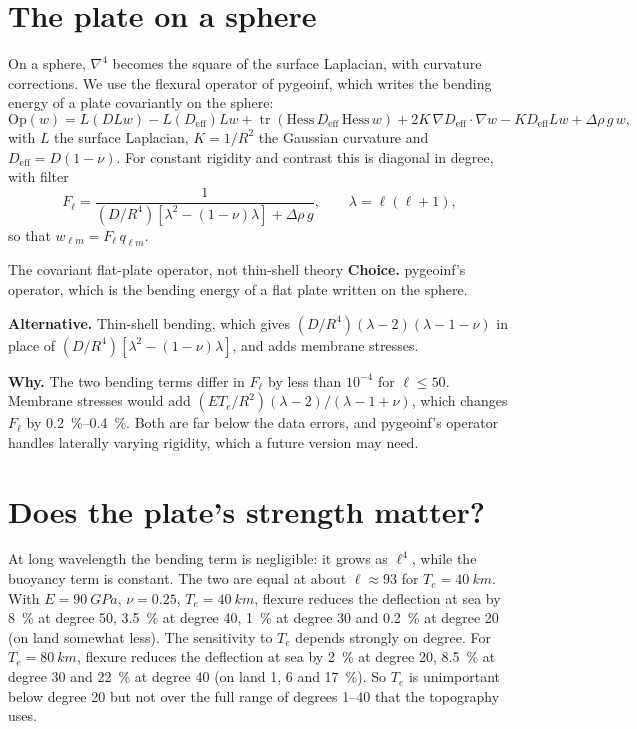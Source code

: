 \section{The plate on a sphere}

On a sphere, $\nabla^4$ becomes the square of the surface Laplacian, with curvature corrections.
We use the flexural operator of pygeoinf, which writes the bending energy of a plate covariantly on the sphere:
\[
    \mathrm{Op}(w) = L(D L w) - L(D_{\mathrm{eff}}) L w + \operatorname{tr}(\mathrm{Hess}\,D_{\mathrm{eff}}\,\mathrm{Hess}\,w) + 2K\,\nabla D_{\mathrm{eff}}\cdot\nabla w - K D_{\mathrm{eff}} L w + \Delta\rho\,g\,w,
\]
with $L$ the surface Laplacian, $K = 1/R^2$ the Gaussian curvature and $D_{\mathrm{eff}} = D(1-\nu)$.
For constant rigidity and contrast this is diagonal in degree, with filter
\begin{equation}
    F_\ell = \frac{1}{(D/R^4)\left[\lambda^2 - (1-\nu)\lambda\right] + \Delta\rho\,g},
    \qquad \lambda = \ell(\ell+1),
\end{equation}
so that $w_{\ell m} = F_\ell\, q_{\ell m}$.

\begin{decision}{The covariant flat-plate operator, not thin-shell theory}
\textbf{Choice.} pygeoinf's operator, which is the bending energy of a flat plate written on the sphere.

\textbf{Alternative.} Thin-shell bending, which gives $(D/R^4)(\lambda-2)(\lambda-1-\nu)$ in place of $(D/R^4)[\lambda^2-(1-\nu)\lambda]$, and adds membrane stresses.

\textbf{Why.} The two bending terms differ in $F_\ell$ by less than $10^{-4}$ for $\ell\le 50$.
Membrane stresses would add $(E T_e/R^2)(\lambda-2)/(\lambda-1+\nu)$, which changes $F_\ell$ by \qtyrange{0.2}{0.4}{\percent}.
Both are far below the data errors, and pygeoinf's operator handles laterally varying rigidity, which a future version may need.
\end{decision}

\section{Does the plate's strength matter?}

At long wavelength the bending term is negligible: it grows as $\ell^4$, while the buoyancy term is constant.
The two are equal at about $\ell\approx 93$ for $T_e = \qty{40}{km}$.
With $E=\qty{90}{GPa}$, $\nu = 0.25$, $T_e = \qty{40}{km}$, flexure reduces the deflection at sea by \qty{8}{\percent} at degree 50, \qty{3.5}{\percent} at degree 40, \qty{1}{\percent} at degree 30 and \qty{0.2}{\percent} at degree 20 (on land somewhat less).
The sensitivity to $T_e$ depends strongly on degree.
For $T_e=\qty{80}{km}$, flexure reduces the deflection at sea by \qty{2}{\percent} at degree 20, \qty{8.5}{\percent} at degree 30 and \qty{22}{\percent} at degree 40 (on land 1, 6 and \qty{17}{\percent}).
So $T_e$ is unimportant below degree 20 but not over the full range of degrees 1--40 that the topography uses.

